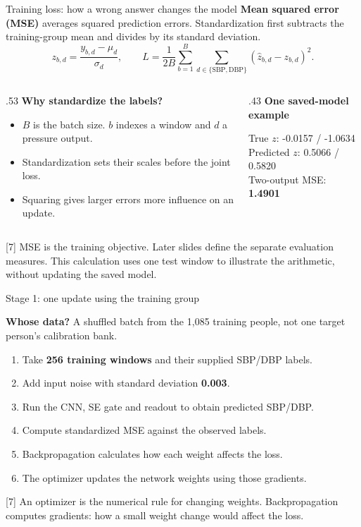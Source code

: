 \documentclass[aspectratio=169,11pt]{beamer}
\newcommand{\source}[1]{\vfill\par{\fontsize{7}{8}\selectfont\color{Muted}#1}}
\newcommand{\whose}[1]{\par{\small\color{Teal}\textbf{Whose data?} #1}\par\medskip}
\begin{document}
\begin{frame}{Training loss: how a wrong answer changes the model}
\textbf{Mean squared error (MSE)} averages squared prediction errors. Standardization first subtracts the training-group mean and divides by its standard deviation.
\[z_{b,d}=\frac{y_{b,d}-\mu_d}{\sigma_d},\qquad
 L=\frac1{2B}\sum_{b=1}^{B}\sum_{d\in\{\mathrm{SBP,DBP}\}}(\widehat z_{b,d}-z_{b,d})^2.\]
\begin{columns}[T]
\begin{column}{.53\textwidth}
\textbf{Why standardize the labels?}
\begin{itemize}\setlength\itemsep{2mm}
\item $B$ is the batch size. $b$ indexes a window and $d$ a pressure output.
\item Standardization sets their scales before the joint loss.
\item Squaring gives larger errors more influence on an update.
\end{itemize}
\end{column}
\begin{column}{.43\textwidth}
\textbf{One saved-model example}\par\medskip
True $z$: -0.0157 / -1.0634\\[2mm]
Predicted $z$: 0.5066 / 0.5820\\[2mm]
Two-output MSE: \textbf{1.4901}
\end{column}
\end{columns}
\source{[7] MSE is the training objective. Later slides define the separate evaluation measures. This calculation uses one test window to illustrate the arithmetic, without updating the saved model.}
\end{frame}

\begin{frame}{Stage 1: one update using the training group}
\whose{A shuffled batch from the 1,085 training people, not one target person's calibration bank.}
\begin{enumerate}\setlength\itemsep{2mm}
\item Take \textbf{256 training windows} and their supplied SBP/DBP labels.
\item Add input noise with standard deviation \textbf{0.003}.
\item Run the CNN, SE gate and readout to obtain predicted SBP/DBP.
\item Compute standardized MSE against the observed labels.
\item Backpropagation calculates how each weight affects the loss.
\item The optimizer updates the network weights using those gradients.
\end{enumerate}
\source{[7] An optimizer is the numerical rule for changing weights. Backpropagation computes gradients: how a small weight change would affect the loss.}
\end{frame}
\end{document}

